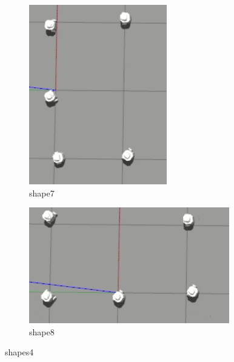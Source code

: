 \documentclass[12pt]{extarticle}
\begin{document}
\begin{figure}
\centering
\begin{subfigure}{.5\textwidth}
  \centering
  \includegraphics[width=.8\linewidth]{shape7}
  \caption{shape7}
  \label{fig:sub1}
\end{subfigure}%
\begin{subfigure}{.5\textwidth}
  \centering
  \includegraphics[width=.8\linewidth]{shape8}
  \caption{shape8}
  \label{fig:sub2}
\end{subfigure}
\caption{shapes4}
\label{fig:test}



\end{figure}
\end{document}
